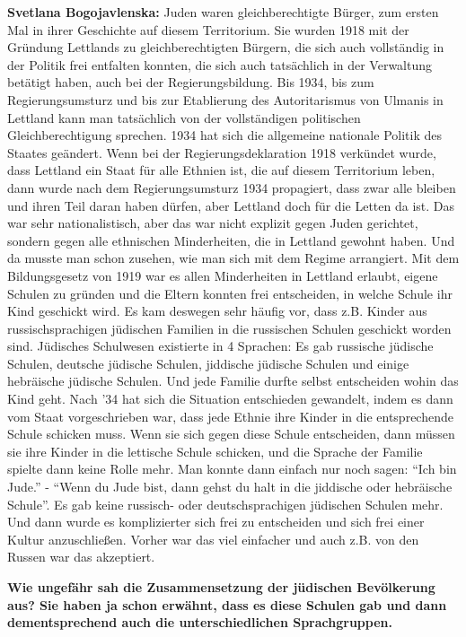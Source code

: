 \textbf{Svetlana Bogojavlenska:} Juden waren gleichberechtigte Bürger, zum ersten Mal in ihrer Geschichte auf diesem Territorium. Sie wurden 1918 mit der Gründung Lettlands zu gleichberechtigten Bürgern, die sich auch vollständig in der Politik frei entfalten konnten, die sich auch tatsächlich in der Verwaltung betätigt haben, auch bei der Regierungsbildung. Bis 1934, bis zum Regierungsumsturz und bis zur Etablierung des Autoritarismus von Ulmanis in Lettland kann man tatsächlich von der vollständigen politischen Gleichberechtigung sprechen.
1934 hat sich die allgemeine nationale Politik des Staates geändert. Wenn bei der Regierungsdeklaration 1918 verkündet wurde, dass Lettland ein Staat für alle Ethnien ist, die auf diesem Territorium leben, dann wurde nach dem Regierungsumsturz 1934 propagiert, dass zwar alle bleiben und ihren Teil daran haben dürfen, aber Lettland doch für die Letten da ist. Das war sehr nationalistisch, aber das war nicht explizit gegen Juden gerichtet, sondern gegen alle ethnischen Minderheiten, die in Lettland gewohnt haben. Und da musste man schon zusehen, wie man sich mit dem Regime arrangiert.
Mit dem Bildungsgesetz von 1919 war es allen Minderheiten in Lettland erlaubt, eigene Schulen zu gründen und die Eltern konnten frei entscheiden, in welche Schule ihr Kind geschickt wird. Es kam deswegen sehr häufig vor, dass z.B. Kinder aus russischsprachigen jüdischen Familien in die russischen Schulen geschickt worden sind. Jüdisches Schulwesen existierte in 4 Sprachen: Es gab russische jüdische Schulen, deutsche jüdische Schulen, jiddische jüdische Schulen und einige hebräische jüdische Schulen. Und jede Familie durfte selbst entscheiden wohin das Kind geht. Nach '34 hat sich die Situation entschieden gewandelt, indem es dann vom Staat vorgeschrieben war, dass jede Ethnie ihre Kinder in die entsprechende Schule schicken muss. Wenn sie sich gegen diese Schule entscheiden, dann müssen sie ihre Kinder in die lettische Schule schicken, und die Sprache der Familie spielte dann keine Rolle mehr. Man konnte dann einfach nur noch sagen: "`Ich bin Jude."' - "`Wenn du Jude bist, dann gehst du halt in die jiddische oder hebräische Schule"'. Es gab keine russisch- oder deutschsprachigen jüdischen Schulen mehr. Und dann wurde es komplizierter sich frei zu entscheiden und sich frei einer Kultur anzuschließen. Vorher war das viel einfacher und auch z.B. von den Russen war das akzeptiert.

\textbf{Wie ungefähr sah die Zusammensetzung der jüdischen Bevölkerung aus? Sie haben ja schon erwähnt, dass es diese Schulen gab und dann dementsprechend auch die unterschiedlichen Sprachgruppen.}

